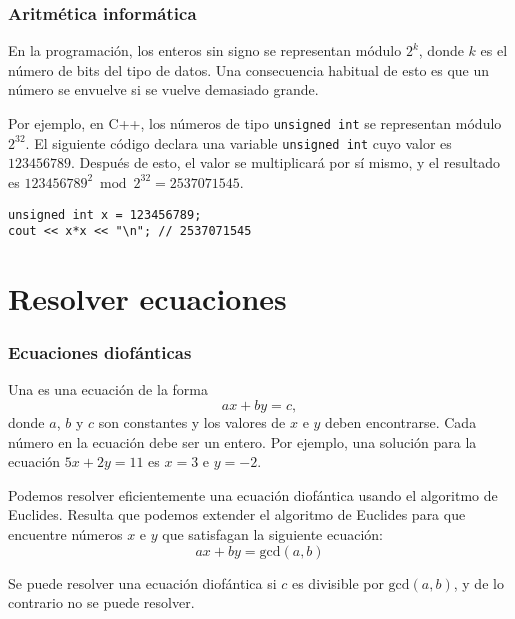 \subsubsection{Aritmética informática}

En la programación, los enteros sin signo se representan módulo $2^k$,
donde $k$ es el número de bits del tipo de datos.
Una consecuencia habitual de esto es que un número se envuelve
si se vuelve demasiado grande.

Por ejemplo, en C++, los números de tipo \texttt{unsigned int}
se representan módulo $2^{32}$.
El siguiente código declara una variable \texttt{unsigned int}
cuyo valor es $123456789$.
Después de esto, el valor se multiplicará por sí mismo,
y el resultado es
$123456789^2 \bmod 2^{32} = 2537071545$.

\begin{lstlisting}
unsigned int x = 123456789;
cout << x*x << "\n"; // 2537071545
\end{lstlisting}

\section{Resolver ecuaciones}

\subsubsection*{Ecuaciones diofánticas}


Una 
es una ecuación de la forma
\[ ax + by = c, \]
donde $a$, $b$ y $c$ son constantes
y los valores de $x$ e $y$ deben encontrarse.
Cada número en la ecuación debe ser un entero.
Por ejemplo, una solución para la ecuación
$5x+2y=11$ es $x=3$ e $y=-2$.


Podemos resolver eficientemente una ecuación diofántica
usando el algoritmo de Euclides.
Resulta que podemos extender el algoritmo de Euclides
para que encuentre números $x$ e $y$
que satisfagan la siguiente ecuación:
\[
ax + by = \textrm{gcd}(a,b)
\]

Se puede resolver una ecuación diofántica si
$c$ es divisible por
$\textrm{gcd}(a,b)$,
y de lo contrario no se puede resolver.

